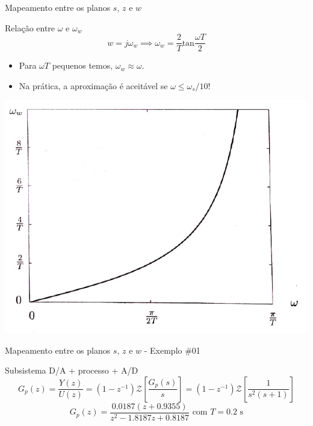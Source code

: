 \begin{frame}{Mapeamento entre os planos $s$, $z$ e $w$}
    \begin{block}{Relação entre $\omega$ e $\omega_w$}
	$$ w = j\omega_w \implies \omega_w = \frac{2}{T} \text{tan} \frac{\omega T}{2} $$
	\vspace{-0.3cm}
	\begin{itemize}
	    \item Para $\omega T$ pequenos temos, $\omega_w \approx \omega$. 
	    \item Na prática, a aproximação é aceitável se $ \omega \leq \omega_s/10$!
	\end{itemize}
	\end{block}
\centerline{\includegraphics[width=0.5\linewidth]{Figuras/Ch13/fig6.png}}
\end{frame}

\begin{frame}{Mapeamento entre os planos $s$, $z$ e $w$ - Exemplo \#01}
\scalebox{0.6}{}
	\begin{block}{Subsistema D/A + processo + A/D}
\vspace{0.2cm}
	\begin{equation*}
	    G_p(z) = \dfrac{Y(z)}{U(z)} = (1 - z^{-1})\mathcal{Z}\left[\dfrac{G_p(s)}{s}\right] = (1 - z^{-1})\mathcal{Z}\left[\dfrac{1}{s^2(s + 1)}\right]
	\end{equation*}
	\begin{equation*}
	    G_p(z) = \dfrac{\num{0,0187}(z + \num{0,9355})}{z^2 - \num{1,8187}z + \num{0,8187}} \text{ com  } T = \num{0,2} \text{\ s}
	\end{equation*}
	\end{block}
\end{frame}

